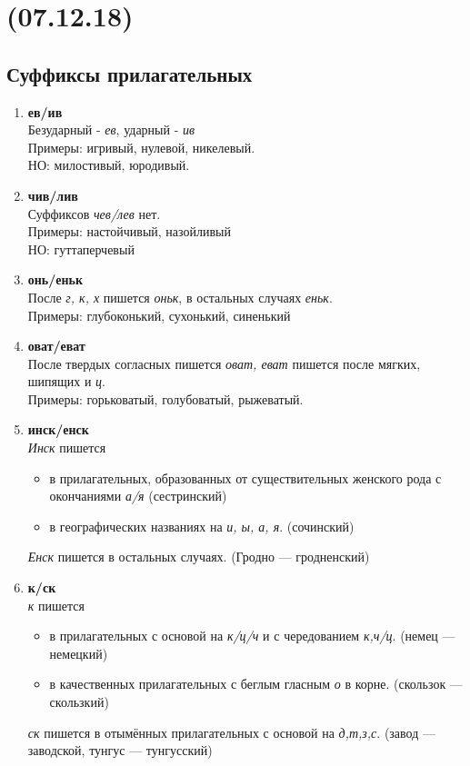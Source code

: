 \documentclass{article}
\begin{document}
\newpage
\noindent\makebox[\linewidth]{\rule{\paperwidth}{0.4pt}}
\section{(07.12.18)}
\noindent\makebox[\linewidth]{\rule{\paperwidth}{0.4pt}}

\subsection{Суффиксы прилагательных}

\begin{enumerate}
\item
  \textbf{ев/ив}\\
  Безударный - \emph{ев}, ударный - \emph{ив}\\
  Примеры: игривый, нулевой, никелевый.\\
  НО: милостивый, юродивый.
\item
  \textbf{чив/лив}\\
  Суффиксов \emph{чев/лев} нет.\\
  Примеры: настойчивый, назойливый\\
  НО: гуттаперчевый

\item
  \textbf{онь/еньк}\\
  После \emph{г, к, х} пишется \emph{оньк}, в остальных случаях \emph{еньк}.\\
  Примеры: глубоконький, сухонький, синенький

\item
  \textbf{оват/еват}\\
  После твердых согласных пишется \emph{оват, еват} пишется после мягких, шипящих и \emph{ц}.\\
  Примеры: горьковатый, голубоватый, рыжеватый.

\item
  \textbf{инск/енск}\\
  \emph{Инск} пишется
  \begin{itemize}
  \item
    в прилагательных, образованных от существительных женского рода с окончаниями \emph{а/я} (сестринский)
  \item
    в географических названиях на \emph{и, ы, а, я}. (сочинский)
  \end{itemize}
  \emph{Енск} пишется в остальных случаях. (Гродно --- гродненский)

\item
  \textbf{к/ск}\\
  \emph{к} пишется
  \begin{itemize}
  \item
    в прилагательных с основой на \emph{к/ц/ч} и с чередованием \emph{к,ч/ц}. (немец --- немецкий)
  \item
    в качественных прилагательных с беглым гласным \emph{о} в корне. (скользок --- скользкий)
  \end{itemize}
  \emph{ск} пишется в отымённых прилагательных с основой на \emph{д,т,з,с}. (завод --- заводской, тунгус --- тунгусский)
  

\end{enumerate}
\end{document}
